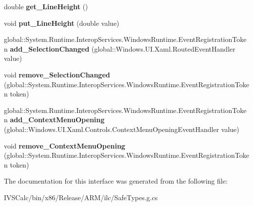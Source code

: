 \begin{DoxyCompactItemize}
double {\bfseries get\+\_\+\+Line\+Height} ()
\item 
\mbox{\label{interface_windows_1_1_u_i_1_1_xaml_1_1_controls_1_1_i_text_block_a303a08f111a62df9e5b76472112e914c}} 
void {\bfseries put\+\_\+\+Line\+Height} (double value)
\item 
\mbox{\label{interface_windows_1_1_u_i_1_1_xaml_1_1_controls_1_1_i_text_block_af727476045815cf9cc9cf515d6d80a24}} 
global\+::\+System.\+Runtime.\+Interop\+Services.\+Windows\+Runtime.\+Event\+Registration\+Token {\bfseries add\+\_\+\+Selection\+Changed} (global\+::\+Windows.\+U\+I.\+Xaml.\+Routed\+Event\+Handler value)
\item 
\mbox{\label{interface_windows_1_1_u_i_1_1_xaml_1_1_controls_1_1_i_text_block_aa5f21aa6c1bfe8efdedfd5dbd95e003a}} 
void {\bfseries remove\+\_\+\+Selection\+Changed} (global\+::\+System.\+Runtime.\+Interop\+Services.\+Windows\+Runtime.\+Event\+Registration\+Token token)
\item 
\mbox{\label{interface_windows_1_1_u_i_1_1_xaml_1_1_controls_1_1_i_text_block_a1d8100da7fff6292db5c7e88860bb898}} 
global\+::\+System.\+Runtime.\+Interop\+Services.\+Windows\+Runtime.\+Event\+Registration\+Token {\bfseries add\+\_\+\+Context\+Menu\+Opening} (global\+::\+Windows.\+U\+I.\+Xaml.\+Controls.\+Context\+Menu\+Opening\+Event\+Handler value)
\item 
\mbox{\label{interface_windows_1_1_u_i_1_1_xaml_1_1_controls_1_1_i_text_block_a68593635321b0b8cd439a3d341f86485}} 
void {\bfseries remove\+\_\+\+Context\+Menu\+Opening} (global\+::\+System.\+Runtime.\+Interop\+Services.\+Windows\+Runtime.\+Event\+Registration\+Token token)
\end{DoxyCompactItemize}


The documentation for this interface was generated from the following file\+:\begin{DoxyCompactItemize}
\item 
I\+V\+S\+Calc/bin/x86/\+Release/\+A\+R\+M/ilc/Safe\+Types.\+g.\+cs\end{DoxyCompactItemize}
